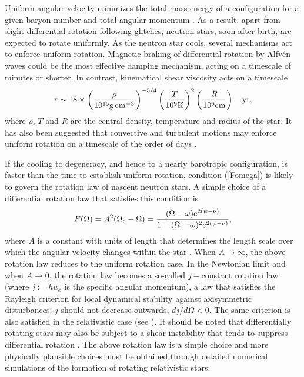 \documentclass[12pt]{article}
\begin{document}
Uniform angular velocity minimizes
the total mass-energy of a configuration for a given baryon number and
total angular momentum \cite{Boyer66,Hartle67}. As a result, 
apart from slight differential rotation following glitches, 
neutron stars, soon after birth, are expected to rotate uniformly. 
As the neutron star cools, several mechanisms act to enforce uniform
rotation. Magnetic braking of differential rotation by Alfv{\'e}n waves 
\cite{Shapiro01,CSS03,LS04} could be the most effective damping
mechanism, acting on a timescale of minutes or shorter. 
 In contrast, 
kinematical shear viscosity acts on a timescale 
\cite{FI76,FI79,Cutler87}
\begin{equation}
\tau \sim 18 \times \left( \frac{\rho}{10^{15}{\rm
g\,cm^{-3}}}\right)^{-5/4}
          \left(\frac{T}{10^9 {\rm K}}\right)^2
          \left(\frac{R}{10^6 {\rm cm}}\right) \ \ \ {\rm yr,}
\end{equation}
where $\rho$, $T$ and $R$ are the central density, temperature and
radius of the star.  It has also been suggested that convective and
turbulent motions may enforce uniform rotation on a timescale of the
order of days \cite{Hegyi77}.  



If the cooling to degeneracy, and hence to a nearly barotropic 
configuration, is faster than the time to establish uniform rotation,
condition (\ref{Fomega}) is likely to govern the rotation law 
of nascent neutron stars. 
A simple choice of a differential rotation law that satisfies 
this condition is
\begin{equation}
F(\Omega)= A^2(\Omega_{\rm c}-\Omega) = \frac{(\Omega-\omega)
e^{2(\psi-\nu)}}{1-(\Omega -\omega)^2e^{2(\psi-\nu)}},
\label{eq:diffKEH}
\end{equation}
where $A$ is a constant with units of length that determines
the length scale over which the angular velocity changes within
the star \cite{KEH89a,KEH89b}.
When $A \to \infty$, the
above rotation law reduces to the uniform rotation case. In the
Newtonian limit and when $A \to 0$, the rotation law becomes a
so-called $j-$constant rotation law (where $j:=h u_\phi$ is the 
specific angular momentum), a law that satisfies the Rayleigh 
criterion for local dynamical stability against axisymmetric 
disturbances: $j$ should not decrease outwards, $dj/d\Omega<0$. 
The same criterion is also satisfied
in the relativistic case (see \cite{KEH89b}). It should be noted that
differentially rotating stars may also be subject to a shear
instability that tends to suppress differential rotation
\cite{Zahn93}.
The above rotation law is a simple choice and more physically 
plausible choices must be obtained through detailed numerical simulations 
of the formation of rotating relativistic stars.
\end{document}
